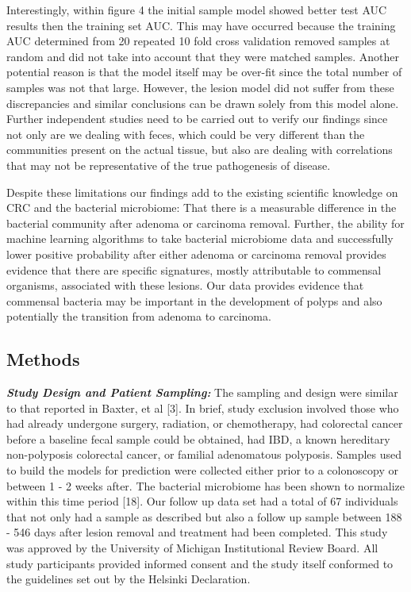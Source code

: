 \documentclass[12pt,]{article}
\begin{document}
Interestingly, within figure 4 the initial sample model showed better
test AUC results then the training set AUC. This may have occurred
because the training AUC determined from 20 repeated 10 fold cross
validation removed samples at random and did not take into account that
they were matched samples. Another potential reason is that the model
itself may be over-fit since the total number of samples was not that
large. However, the lesion model did not suffer from these discrepancies
and similar conclusions can be drawn solely from this model alone.
Further independent studies need to be carried out to verify our
findings since not only are we dealing with feces, which could be very
different than the communities present on the actual tissue, but also
are dealing with correlations that may not be representative of the true
pathogenesis of disease.

Despite these limitations our findings add to the existing scientific
knowledge on CRC and the bacterial microbiome: That there is a
measurable difference in the bacterial community after adenoma or
carcinoma removal. Further, the ability for machine learning algorithms
to take bacterial microbiome data and successfully lower positive
probability after either adenoma or carcinoma removal provides evidence
that there are specific signatures, mostly attributable to commensal
organisms, associated with these lesions. Our data provides evidence
that commensal bacteria may be important in the development of polyps
and also potentially the transition from adenoma to carcinoma.

\newpage

\subsection{Methods}\label{methods}

\textbf{\emph{Study Design and Patient Sampling:}} The sampling and
design were similar to that reported in Baxter, et al {[}3{]}. In brief,
study exclusion involved those who had already undergone surgery,
radiation, or chemotherapy, had colorectal cancer before a baseline
fecal sample could be obtained, had IBD, a known hereditary
non-polyposis colorectal cancer, or familial adenomatous polyposis.
Samples used to build the models for prediction were collected either
prior to a colonoscopy or between 1 - 2 weeks after. The bacterial
microbiome has been shown to normalize within this time period {[}18{]}.
Our follow up data set had a total of 67 individuals that not only had a
sample as described but also a follow up sample between 188 - 546 days
after lesion removal and treatment had been completed. This study was
approved by the University of Michigan Institutional Review Board. All
study participants provided informed consent and the study itself
conformed to the guidelines set out by the Helsinki Declaration.
\end{document}
